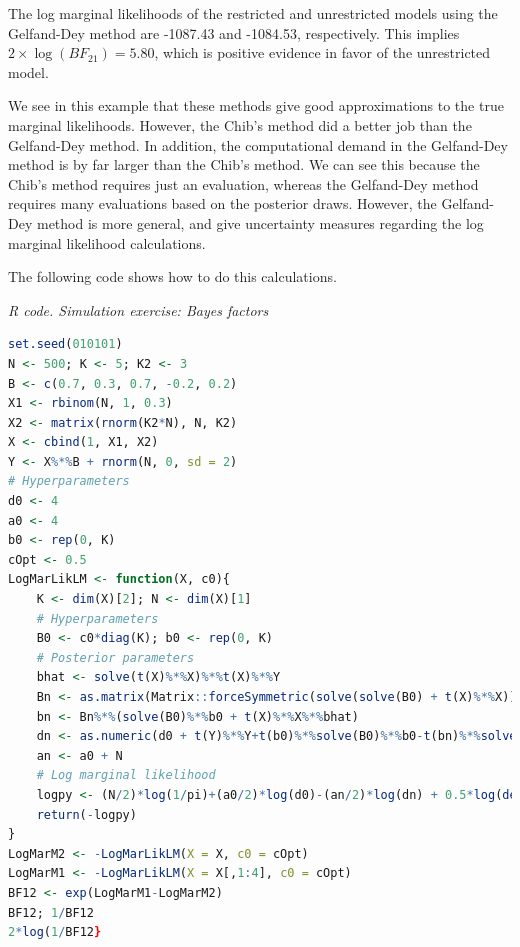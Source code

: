 The log marginal likelihoods of the restricted and unrestricted models using the Gelfand-Dey method are -1087.43 and -1084.53, respectively. This implies $2\times \log(BF_{21})=5.80$, which is positive evidence in favor of the unrestricted model.

We see in this example that these methods give good approximations to the true marginal likelihoods. However, the Chib's method did a better job than the Gelfand-Dey method. In addition, the computational demand in the Gelfand-Dey method is by far larger than the Chib's method. We can see this because the Chib's method requires just an evaluation, whereas the Gelfand-Dey method requires many evaluations based on the posterior draws. However, the Gelfand-Dey method is more general, and give uncertainty measures regarding the log marginal likelihood calculations.

The following code shows how to do this calculations.


\begin{tcolorbox}[enhanced,width=4.67in,center upper,
	fontupper=\large\bfseries,drop shadow southwest,sharp corners]
	\textit{R code. Simulation exercise: Bayes factors}
	\begin{VF}
		\begin{lstlisting}[language=R]
set.seed(010101)
N <- 500; K <- 5; K2 <- 3 
B <- c(0.7, 0.3, 0.7, -0.2, 0.2) 
X1 <- rbinom(N, 1, 0.3)
X2 <- matrix(rnorm(K2*N), N, K2)
X <- cbind(1, X1, X2)
Y <- X%*%B + rnorm(N, 0, sd = 2)
# Hyperparameters
d0 <- 4
a0 <- 4
b0 <- rep(0, K)
cOpt <- 0.5
LogMarLikLM <- function(X, c0){
	K <- dim(X)[2]; N <- dim(X)[1]	
	# Hyperparameters
	B0 <- c0*diag(K); b0 <- rep(0, K)
	# Posterior parameters
	bhat <- solve(t(X)%*%X)%*%t(X)%*%Y
	Bn <- as.matrix(Matrix::forceSymmetric(solve(solve(B0) + t(X)%*%X))) 
	bn <- Bn%*%(solve(B0)%*%b0 + t(X)%*%X%*%bhat)
	dn <- as.numeric(d0 + t(Y)%*%Y+t(b0)%*%solve(B0)%*%b0-t(bn)%*%solve(Bn)%*%bn)
	an <- a0 + N
	# Log marginal likelihood
	logpy <- (N/2)*log(1/pi)+(a0/2)*log(d0)-(an/2)*log(dn) + 0.5*log(det(Bn)/det(B0)) + lgamma(an/2)-lgamma(a0/2)
	return(-logpy)
}
LogMarM2 <- -LogMarLikLM(X = X, c0 = cOpt)
LogMarM1 <- -LogMarLikLM(X = X[,1:4], c0 = cOpt)
BF12 <- exp(LogMarM1-LogMarM2) 
BF12; 1/BF12
2*log(1/BF12}
\end{lstlisting}
	\end{VF}
\end{tcolorbox}            


